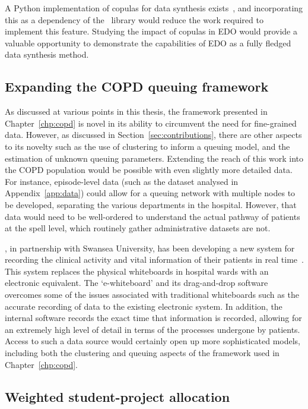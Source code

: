 A Python implementation of copulas for data synthesis exists~\cite{copulas}, and
incorporating this as a dependency of the \edo\ library would reduce the work
required to implement this feature. Studying the impact of copulas in EDO would
provide a valuable opportunity to demonstrate the capabilities of EDO as a fully
fledged data synthesis method.

\subsection*{Expanding the COPD queuing framework}

As discussed at various points in this thesis, the framework presented in
Chapter~\ref{chp:copd} is novel in its ability to circumvent the need for
fine-grained data. However, as discussed in Section~\ref{sec:contributions},
there are other aspects to its novelty such as the use of clustering to inform a
queuing model, and the estimation of unknown queuing parameters. Extending the
reach of this work into the COPD population would be possible with even slightly
more detailed data. For instance, episode-level data (such as the dataset
analysed in Appendix~\ref{app:data}) could allow for a queuing network with
multiple nodes to be developed, separating the various departments in the
hospital. However, that data would need to be well-ordered to understand the
actual pathway of patients at the spell level, which routinely gather
administrative datasets are not.

\ctmuhb, in partnership with Swansea University, has been developing a new
system for recording the clinical activity and vital information of their
patients in real time~\cite{whiteboards}. This system replaces the physical
whiteboards in hospital wards with an electronic equivalent. The `e-whiteboard'
and its drag-and-drop software overcomes some of the issues associated with
traditional whiteboards such as the accurate recording of data to the existing
electronic system. In addition, the internal software records the exact time
that information is recorded, allowing for an extremely high level of detail in
terms of the processes undergone by patients. Access to such a data source would
certainly open up more sophisticated models, including both the clustering and
queuing aspects of the framework used in Chapter~\ref{chp:copd}.

\subsection*{Weighted student-project allocation}

